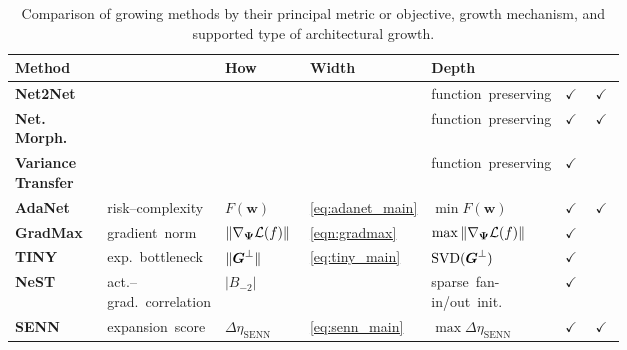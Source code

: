 \newcommand{\growingdash}{\multicolumn{1}{c}{--}}

\begin{table}[t!]
\centering
\caption{Comparison of growing methods by their principal metric or objective, growth mechanism, and supported type of architectural growth.}
\label{tab:growing_methods}
\fontsize{5.5pt}{6.5pt}\selectfont
\setlength{\tabcolsep}{3pt}
\begin{tabularx}{\linewidth}{
    p{0.20\linewidth}
    >{\centering\arraybackslash}p{0.14\linewidth}
    >{\centering\arraybackslash}p{0.16\linewidth}
    >{\centering\arraybackslash}p{0.07\linewidth}
    >{\centering\arraybackslash}X
    >{\centering\arraybackslash}p{0.07\linewidth}
    >{\centering\arraybackslash}p{0.07\linewidth}
}
\toprule
\textbf{Method}
& \multicolumn{3}{c}{\textbf{Growth Metric}}
& \textbf{How}
& \textbf{Width}
& \textbf{Depth} \\

\midrule

\textbf{Net2Net}
& \growingdash
& \growingdash
& \growingdash
& \mbox{function preserving}
& $\checkmark$
& $\checkmark$ \\

\textbf{Net. Morph.}
& \growingdash
& \growingdash
& \growingdash
& \mbox{function preserving}
& $\checkmark$
& $\checkmark$ \\

\textbf{Variance Transfer}
& \growingdash
& \growingdash
& \growingdash
& \mbox{function preserving}
& $\checkmark$
& \\

\textbf{AdaNet}
& \mbox{risk--complexity}
& $F(\mathbf{w})$
& \eqref{eq:adanet_main}
& $\min F(\mathbf{w})$
& $\checkmark$
& $\checkmark$ \\

\midrule

\textbf{GradMax}
& \mbox{gradient norm}
& $\|\nabla_{\boldsymbol{\Psi}}\mathcal{L}(f)\|$
& \eqref{eqn:gradmax}
& $\max\|\nabla_{\boldsymbol{\Psi}}\mathcal{L}(f)\|$
& $\checkmark$
& \\

\textbf{TINY}
& \mbox{exp. bottleneck}
& $\|\boldsymbol{G}^\perp\|$
& \eqref{eq:tiny_main}
& $\operatorname{SVD}(\boldsymbol{G}^\perp)$
& $\checkmark$
& \\

\textbf{NeST}
& \mbox{act.--grad. correlation}
& $|B_{-2}|$
& \growingdash
& \mbox{sparse fan-in/out init.}
& $\checkmark$
& \\

\textbf{SENN}
& \mbox{expansion score}
& $\Delta\eta_{\mathrm{SENN}}$
& \eqref{eq:senn_main}
& $\max\Delta\eta_{\mathrm{SENN}}$
& $\checkmark$
& $\checkmark$ \\


\end{tabularx}
\end{table}
